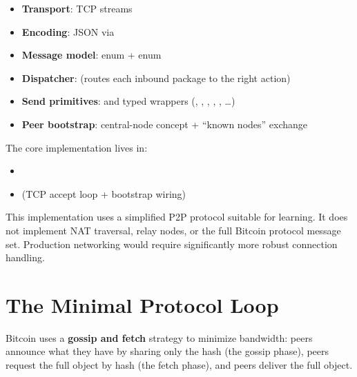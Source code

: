 \begin{itemize}
  \item \textbf{Transport}: TCP streams
  \item \textbf{Encoding}: JSON via 
  \item \textbf{Message model}:  enum +  enum
  \item \textbf{Dispatcher}:  (routes each inbound package to the right action)
  \item \textbf{Send primitives}:  and typed wrappers (, , , , , \ldots)
  \item \textbf{Peer bootstrap}: central-node concept + ``known nodes'' exchange
\end{itemize}

The core implementation lives in:

\begin{itemize}
  \item {}
  \item {} (TCP accept loop + bootstrap wiring)
\end{itemize}

\begin{warnbox}
This implementation uses a simplified P2P protocol suitable for learning. It does not implement NAT traversal, relay nodes, or the full Bitcoin protocol message set. Production networking would require significantly more robust connection handling.
\end{warnbox}

\section{The Minimal Protocol Loop}
\label{sec:ch12-protocol-loop}

Bitcoin uses a \textbf{gossip and fetch} strategy to minimize bandwidth: peers announce what they have by sharing only the hash (the gossip phase), peers request the full object by hash (the fetch phase), and peers deliver the full object.

